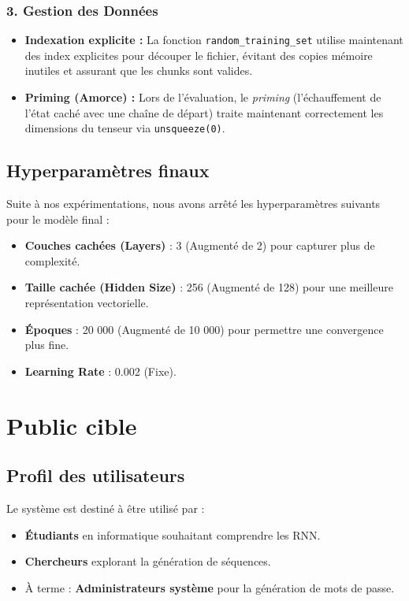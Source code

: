 \documentclass[a4paper]{article}
\begin{document}
\subsubsection{3. Gestion des Données}
\begin{itemize}
    \item \textbf{Indexation explicite :}\newline
    La fonction \lstinline|random_training_set| utilise maintenant des index explicites pour découper le fichier, évitant des copies mémoire inutiles et assurant que les chunks sont valides.
    \item \textbf{Priming (Amorce) :}\newline
    Lors de l'évaluation, le \textit{priming} (l'échauffement de l'état caché avec une chaîne de départ) traite maintenant correctement les dimensions du tenseur via \lstinline|unsqueeze(0)|.
\end{itemize}

\subsection{Hyperparamètres finaux}
Suite à nos expérimentations, nous avons arrêté les hyperparamètres suivants pour le modèle final :
\begin{itemize}
    \item \textbf{Couches cachées (Layers)} : 3 (Augmenté de 2) pour capturer plus de complexité.
    \item \textbf{Taille cachée (Hidden Size)} : 256 (Augmenté de 128) pour une meilleure représentation vectorielle.
    \item \textbf{Époques} : 20 000 (Augmenté de 10 000) pour permettre une convergence plus fine.
    \item \textbf{Learning Rate} : 0.002 (Fixe).
\end{itemize}

\section{Public cible}

\subsection{Profil des utilisateurs}
Le système est destiné à être utilisé par :
\begin{itemize}
    \item \textbf{Étudiants} en informatique souhaitant comprendre les RNN.
    \item \textbf{Chercheurs} explorant la génération de séquences.
    \item À terme : \textbf{Administrateurs système} pour la génération de mots de passe.
\end{itemize}
\end{document}
